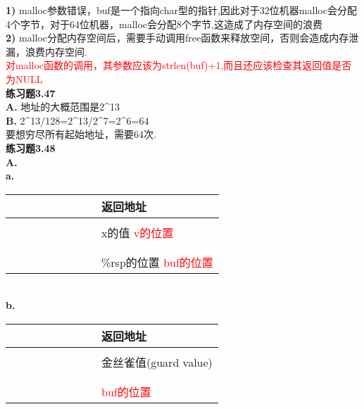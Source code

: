 \documentclass{article}
\newcommand{\red}[1]{\textcolor{red}{#1}}
\begin{document}
\begin{CJK}{UTF8}{uyhei}
\textbf{1)} malloc参数错误，buf是一个指向char型的指针,因此对于32位机器malloc会分配4个字节，对于64位机器，malloc会分配8个字节,这造成了内存空间的浪费	\\
\textbf{2)} malloc分配内存空间后，需要手动调用free函数来释放空间，否则会造成内存泄漏，浪费内存空间.	\\
\red{对malloc函数的调用，其参数应该为strlen(buf)+1,而且还应该检查其返回值是否为NULL}	\\[2ex]
\textbf{练习题3.47}	\\
\textbf{A.} 地址的大概范围是2\^{}13	\\
\textbf{B.} 2\^{}13/128=2\^{}13/2\^{}7=2\^{}6=64	\\
要想穷尽所有起始地址，需要64次.	\\[2ex]
\textbf{练习题3.48}	\\
\textbf{A.}	\\
\textbf{a.}	\\[-2ex]
\renewcommand\arraystretch{1.4}
\begin{table}[htbp]
\centering
\begin{tabular}{|m{2em}<{\centering}m{2em}<{\centering}m{2em}<{\centering}m{2em}<{\centering}m{2em}<{\centering}m{2em}<{\centering}m{2em}<{\centering}m{2em}<{\centering}|m{16em}<{\centering}|}
\hline
	&	&	&	&	&	&	&		&	返回地址	\\
\hline
	\\
\hline
&	&	&	&	&	&	&		&	x的值 \red{v的位置}	\\
\hline
	\\
\hline
	\\
\hline
&	&	&	&	&	&	&		&	\%rsp的位置 \red{buf的位置}	\\
\hline
\end{tabular}
\end{table}	\\[2ex]
\textbf{b.}	\\
\renewcommand\arraystretch{1.4}
\begin{table}[htbp]
\centering
\begin{tabular}{|m{2em}<{\centering}m{2em}<{\centering}m{2em}<{\centering}m{2em}<{\centering}m{2em}<{\centering}m{2em}<{\centering}m{2em}<{\centering}m{2em}<{\centering}|m{16em}<{\centering}|}
\hline
	&	&	&	&	&	&	&		&	返回地址	\\
\hline
	\\
\hline
	&	&	&	&	&	&	&		&	金丝雀值(guard value)	\\
\hline
	\\
\hline
	\\
\hline
	&	&	&	&	&	&	&		&	\red{buf的位置}	\\

\end{tabular}
\end{table}
\end{CJK}
\end{document}
